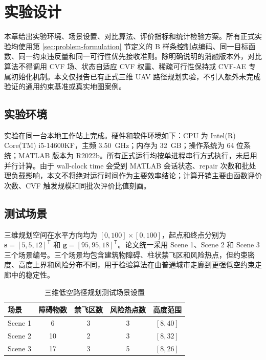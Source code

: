 \section{实验设计}
\label{sec:experimental-setup}

本章给出实验环境、场景设置、对比算法、评价指标和统计检验方案。所有正式实验均使用第 \ref{sec:problem-formulation} 节定义的 B 样条控制点编码、同一目标函数、同一约束违反量和同一可行性优先接收准则。除明确说明的消融版本外，对比算法不得调用 CVF 场、状态自适应 CVF 权重、稀疏可行性保持或 CVF-AE 专属初始化机制。本文仅报告已有正式三维 UAV 路径规划实验，不引入额外未完成验证的通用约束基准或真实地图案例。

\subsection{实验环境}

实验在同一台本地工作站上完成。硬件和软件环境如下：CPU 为 Intel(R) Core(TM) i5-14600KF，主频 \SI{3.50}{GHz}；内存为 \SI{32}{GB}；操作系统为 64 位系统；MATLAB 版本为 R2022b。所有正式运行均按单进程串行方式执行，未启用并行计算。由于 wall-clock time 会受到 MATLAB 会话状态、repair 次数和批处理负载影响，本文不将绝对运行时间作为主要效率结论；计算开销主要由函数评价次数、CVF 触发规模和同批次评价比值刻画。

\subsection{测试场景}

三维规划空间在水平方向均为 $[0,100]\times[0,100]$，起点和终点分别为 $\mathbf{s}=[5,5,12]^\mathsf{T}$ 和 $\mathbf{g}=[95,95,18]^\mathsf{T}$。论文统一采用 Scene 1、Scene 2 和 Scene 3 三个场景编号。三个场景均包含建筑物障碍、柱状禁飞区和风险热点，但约束密度、高度上界和风险分布不同，用于检验算法在由普通城市走廊到更强低空约束走廊中的稳定性。

\begin{table}[tbp]
\centering
\caption{三维低空路径规划测试场景设置}
\label{tab:scene-setup}
\small
\begin{tabular}{@{}lcccc@{}}
\toprule
场景 & 障碍物数 & 禁飞区数 & 风险热点数 & 高度范围 \\
\midrule
Scene 1 & 6 & 3 & 3 & $[8,40]$ \\
Scene 2 & 10 & 2 & 3 & $[8,32]$ \\
Scene 3 & 17 & 3 & 5 & $[8,26]$ \\
\bottomrule
\end{tabular}
\end{table}


